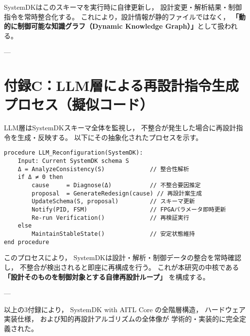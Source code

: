 SystemDKはこのスキーマを実行時に自律更新し，
設計変更・解析結果・制御指令を常時整合化する。
これにより，設計情報が静的ファイルではなく，
\textbf{「動的に制御可能な知識グラフ（Dynamic Knowledge Graph）」}として扱われる。

---

\section*{付録C：LLM層による再設計指令生成プロセス（擬似コード）}

LLM層はSystemDKスキーマ全体を監視し，
不整合が発生した場合に再設計指令を生成・反映する。
以下にその抽象化されたプロセスを示す。

\begin{verbatim}
procedure LLM_Reconfiguration(SystemDK):
    Input: Current SystemDK schema S
    Δ = AnalyzeConsistency(S)             // 整合性解析
    if Δ ≠ 0 then
        cause     = Diagnose(Δ)           // 不整合要因推定
        proposal  = GenerateRedesign(cause) // 再設計案生成
        UpdateSchema(S, proposal)         // スキーマ更新
        Notify(PID, FSM)                  // FPGAパラメータ即時更新
        Re-run Verification()             // 再検証実行
    else
        MaintainStableState()             // 安定状態維持
end procedure
\end{verbatim}

このプロセスにより，
SystemDKは設計・解析・制御データの整合を常時確認し，
不整合が検出されると即座に再構成を行う。
これが本研究の中核である
\textbf{「設計そのものを制御対象とする自律再設計ループ」}
を構成する。

---

\noindent
以上の3付録により，
SystemDK with AITL Core の全階層構造，
ハードウェア実装仕様，
および知的再設計アルゴリズムの全体像が
学術的・実装的に完全定義された。
